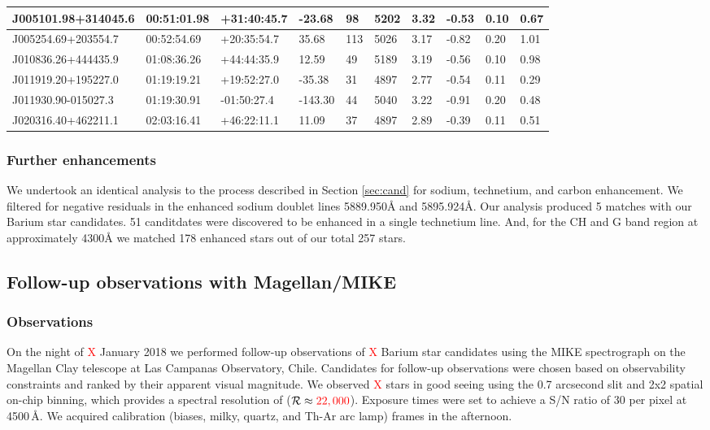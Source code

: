 \documentclass[a4paper,fleqn,usenatbib]{mnras}
\newcommand{\todo}[1]{\textcolor{red}{#1}}
\begin{document}
\begin{table}
\begin{tabular}{@{}|l|l|l|l|l|l|l|l|l|l|@{}}
J005101.98+314045.6 & 00:51:01.98 & +31:40:45.7 & -23.68    & 98  & 5202 & 3.32  & -0.53      & 0.10      & 0.67 \\ \midrule
J005254.69+203554.7 & 00:52:54.69 & +20:35:54.7 & 35.68     & 113 & 5026 & 3.17  & -0.82      & 0.20      & 1.01 \\ \midrule
J010836.26+444435.9 & 01:08:36.26 & +44:44:35.9 & 12.59     & 49  & 5189 & 3.19  & -0.56      & 0.10      & 0.98 \\ \midrule
J011919.20+195227.0 & 01:19:19.21 & +19:52:27.0 & -35.38    & 31  & 4897 & 2.77  & -0.54      & 0.11      & 0.29 \\ \midrule
J011930.90-015027.3 & 01:19:30.91 & -01:50:27.4 & -143.30   & 44  & 5040 & 3.22  & -0.91      & 0.20      & 0.48 \\ \midrule
J020316.40+462211.1 & 02:03:16.41 & +46:22:11.1 & 11.09     & 37  & 4897 & 2.89  & -0.39      & 0.11      & 0.51 \\ \bottomrule
\end{tabular}
\end{table}


\subsubsection{Further enhancements}
We undertook an identical analysis to the process described in Section \ref{sec:cand} for sodium, technetium, and carbon enhancement. We filtered for negative residuals in the enhanced sodium doublet lines 5889.950\AA\hspace{0.2mm} and 5895.924\AA. Our analysis produced 5 matches with our Barium star candidates. 51 canditdates were discovered to be enhanced in a single technetium line. And, for the CH and G band region at approximately 4300\AA\hspace{0.2mm} we matched 178 enhanced stars out of our total 257 stars. 

\subsection{Follow-up observations with Magellan/MIKE}

\subsubsection{Observations}
On the night of \todo{X} January 2018 we performed follow-up observations of \todo{X} Barium star candidates using the MIKE spectrograph on the Magellan Clay telescope at Las Campanas Observatory, Chile. Candidates for follow-up observations were chosen based on observability constraints and ranked by their apparent visual magnitude. We observed \todo{X} stars in good seeing using the 0.7 arcsecond slit and 2x2 spatial on-chip binning, which provides a spectral resolution of ($\mathcal{R} \approx \todo{22,000}$). Exposure times were set to achieve a S/N ratio of 30 per pixel at 4500\,\AA. We acquired calibration (biases, milky, quartz, and Th-Ar arc lamp) frames in the afternoon.
\end{document}
